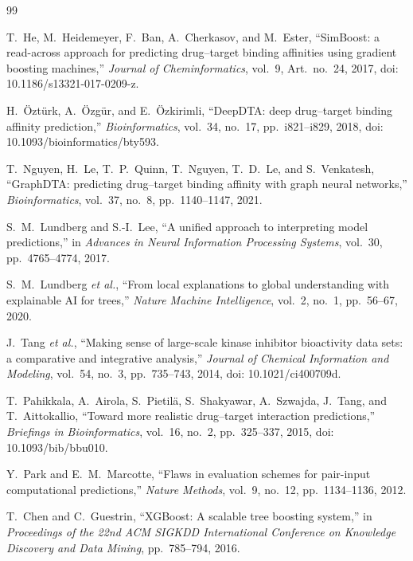 \documentclass[10pt,conference]{IEEEtran}
\begin{document}
\begin{thebibliography}{99}

 T.~He, M.~Heidemeyer, F.~Ban, A.~Cherkasov, and M.~Ester, ``SimBoost: a read-across approach for predicting drug--target binding affinities using gradient boosting machines,'' \textit{Journal of Cheminformatics}, vol.~9, Art.~no.~24, 2017, doi: 10.1186/s13321-017-0209-z.

 H.~\"{O}zt\"{u}rk, A.~\"{O}zg\"{u}r, and E.~\"{O}zkirimli, ``DeepDTA: deep drug--target binding affinity prediction,'' \textit{Bioinformatics}, vol.~34, no.~17, pp.~i821--i829, 2018, doi: 10.1093/bioinformatics/bty593.

 T.~Nguyen, H.~Le, T.~P.~Quinn, T.~Nguyen, T.~D.~Le, and S.~Venkatesh, ``GraphDTA: predicting drug--target binding affinity with graph neural networks,'' \textit{Bioinformatics}, vol.~37, no.~8, pp.~1140--1147, 2021.

 S.~M.~Lundberg and S.-I.~Lee, ``A unified approach to interpreting model predictions,'' in \textit{Advances in Neural Information Processing Systems}, vol.~30, pp.~4765--4774, 2017.

 S.~M.~Lundberg \textit{et al.}, ``From local explanations to global understanding with explainable AI for trees,'' \textit{Nature Machine Intelligence}, vol.~2, no.~1, pp.~56--67, 2020.

 J.~Tang \textit{et al.}, ``Making sense of large-scale kinase inhibitor bioactivity data sets: a comparative and integrative analysis,'' \textit{Journal of Chemical Information and Modeling}, vol.~54, no.~3, pp.~735--743, 2014, doi: 10.1021/ci400709d.

 T.~Pahikkala, A.~Airola, S.~Pietil\"{a}, S.~Shakyawar, A.~Szwajda, J.~Tang, and T.~Aittokallio, ``Toward more realistic drug--target interaction predictions,'' \textit{Briefings in Bioinformatics}, vol.~16, no.~2, pp.~325--337, 2015, doi: 10.1093/bib/bbu010.

 Y.~Park and E.~M.~Marcotte, ``Flaws in evaluation schemes for pair-input computational predictions,'' \textit{Nature Methods}, vol.~9, no.~12, pp.~1134--1136, 2012.

 T.~Chen and C.~Guestrin, ``XGBoost: A scalable tree boosting system,'' in \textit{Proceedings of the 22nd ACM SIGKDD International Conference on Knowledge Discovery and Data Mining}, pp.~785--794, 2016.


\end{thebibliography}
\end{document}
